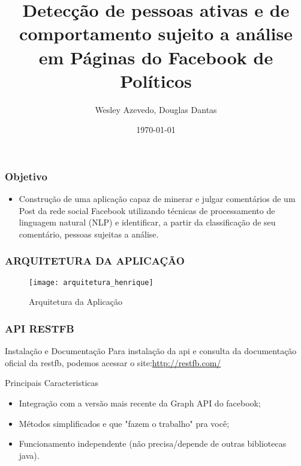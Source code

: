 \documentclass{beamer}
\title{Detec\c{c}\~ao de pessoas ativas e de comportamento sujeito a an\'alise em P\'aginas do Facebook de Pol\'iticos}
\author{Wesley Azevedo, Douglas Dantas}
\date{\today}
\institute{Instituto Federal de Educa\c{c}\~ao Ci\^encia e Tecnologia da Para\'{\i}ba}
\begin{document}
\frame{\titlepage}

\begin{frame}
	\frametitle{Objetivo}
	\begin{itemize}
	\item Constru\c{c}\~ao de uma aplica\c{c}\~ao capaz de minerar e julgar coment\'arios de um Post da rede social Facebook utilizando t\'ecnicas de processamento de linguagem natural (NLP) e identificar, a partir da classifica\c{c}\~ao de seu coment\'ario, pessoas sujeitas a an\'alise.
	\end{itemize}

\end{frame}

\begin{frame}
	\frametitle{ARQUITETURA DA APLICA\c{C}\~AO}
	\begin{figure}[h]
    		\centering
    		\texttt{[image: arquitetura\_henrique]}
    		\caption{Arquitetura da Aplica\c{c}\~ao}\label{arquitetura_henrique}
  	\end{figure}
\end{frame}

\begin{frame}
	\frametitle{API RESTFB}
	\begin{block}{Instala\c{c}\~ao e Documenta\c{c}\~ao}
		Para instala\c{c}\~ao da api e consulta da documenta\c{c}\~ao oficial da restfb, 
		podemos acessar o site:\href {http://restfb.com/}{http://restfb.com/}
	\end{block}
	\begin{block}{Principais Caracteristicas}
		\begin{itemize}
			\item Integra\c{c}\~ao com a vers\~ao mais recente da Graph API do facebook;
			\item M\'etodos simplificados e que "fazem o trabalho" pra voc\^e; 
			\item Funcionamento independente (n\~ao precisa/depende de outras bibliotecas java).
		\end{itemize}
	\end{block}
\end{frame}
\end{document}
